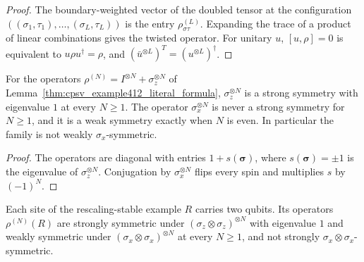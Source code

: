 \begin{proof}\leanok
    The boundary-weighted vector of the doubled tensor at the configuration
    $((\sigma_1,\tau_1),\dots,(\sigma_L,\tau_L))$ is the entry
    $\rho^{(L)}_{\sigma\tau}$. Expanding the trace of a product of linear
    combinations gives the twisted operator. For unitary $u$, $[u,\rho]=0$
    is equivalent to $u\rho u^\dagger=\rho$, and
    $(\bar u^{\otimes L})^T=(u^{\otimes L})^\dagger$.
\end{proof}

\begin{lemma}\label{thm:mpdo_example412_symmetries}
    \leanok
    For the operators $\rho^{(N)}=I^{\otimes N}+\sigma_z^{\otimes N}$ of
    Lemma~\ref{thm:cpsv_example412_literal_formula}, $\sigma_z^{\otimes N}$
    is a strong symmetry with eigenvalue $1$ at every $N\ge 1$. The operator
    $\sigma_x^{\otimes N}$ is never a strong symmetry for $N\ge 1$, and it is
    a weak symmetry exactly when $N$ is even. In particular the family is not
    weakly $\sigma_x$-symmetric.
\end{lemma}

\begin{proof}\leanok
    The operators are diagonal with entries $1+s(\boldsymbol\sigma)$, where
    $s(\boldsymbol\sigma)=\pm1$ is the eigenvalue of $\sigma_z^{\otimes N}$.
    Conjugation by $\sigma_x^{\otimes N}$ flips every spin and multiplies
    $s$ by $(-1)^N$.
\end{proof}

\begin{lemma}
    \label{thm:mpdo_rescaling_stable_symmetries}
    \leanok
    Each site of the rescaling-stable example $R$ carries two qubits. Its
    operators $\rho^{(N)}(R)$ are strongly symmetric under
    $(\sigma_z\otimes\sigma_z)^{\otimes N}$ with eigenvalue $1$ and weakly
    symmetric under $(\sigma_x\otimes\sigma_x)^{\otimes N}$ at every
    $N\ge 1$, and not strongly $\sigma_x\otimes\sigma_x$-symmetric.
\end{lemma}

